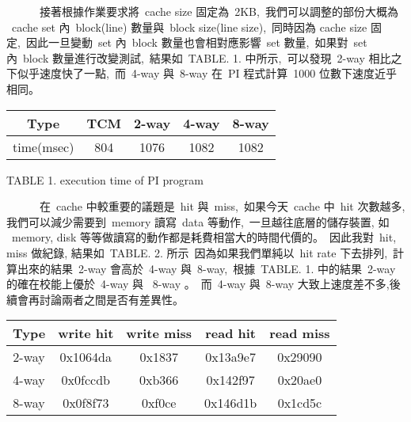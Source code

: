 \documentclass{article}
\begin{document}
\begin{CJK*}{UTF8}{bsmi}
\begin{multicols}{2}
\begin{flushleft}
    \ \ \ \ \ \ 接著根據作業要求將\ cache size 固定為\ 2KB,\
    我們可以調整的部份大概為 \ cache set 內\ block(line) 數量與\ block size(line size),\
    同時因為 cache size 固定,\
    因此一旦變動\ set 內\ block 數量也會相對應影響\ set 數量,\
    如果對\ set 內\ block 數量進行改變測試,\
    結果如\ TABLE. 1. 中所示,\
    可以發現\ 2-way 相比之下似乎速度快了一點,\
    而\ 4-way 與\ 8-way 在\ PI 程式計算\ 1000 位數下速度近乎相同。\
\end{flushleft}

\begin{center}
    \begin{tabular}{||c c c c c ||} 
     \hline
     Type & TCM & 2-way & 4-way & 8-way \\ [2ex] 
     \hline\hline
     time(msec) & 804 & 1076  & 1082 & 1082 \\ 
     \hline
    \end{tabular}
\end{center}

\begin{center}
    \small{TABLE 1. execution time of PI program}\\
\end{center}

\begin{flushleft}
    \ \ \ \ \ \ 在\ cache 中較重要的議題是\ hit 與\ miss,\
    如果今天\ cache 中\ hit 次數越多, 我們可以減少需要到\ memory 讀寫\ data 等動作,\
    一旦越往底層的儲存裝置, 如 \ memory, disk 等等做讀寫的動作都是耗費相當大的時間代價的。\
    因此我對\ hit, miss 做紀錄, 結果如\ TABLE. 2. 所示\
    因為如果我們單純以\ hit rate 下去排列,\
    計算出來的結果\ 2-way 會高於\ 4-way 與\ 8-way,\
    根據\ TABLE. 1. 中的結果\ 2-way 的確在校能上優於\ 4-way 與 \ 8-way 。\
    而\ 4-way 與\ 8-way 大致上速度差不多,後續會再討論兩者之間是否有差異性。
\end{flushleft}

\begin{center}
    \begin{tabular}{||c c c c c ||} 
     \hline
     Type & write hit & write miss & read hit & read miss \\ [2ex] 
     \hline\hline
     2-way & 0x1064da & 0x1837 & 0x13a9e7 & 0x29090  \\ 
     \hline
     4-way & 0x0fccdb & 0xb366 & 0x142f97 & 0x20ae0  \\ 
     \hline
     8-way & 0x0f8f73 & 0xf0ce & 0x146d1b & 0x1cd5c  \\ 
     \hline
    \end{tabular}
\end{center}


\end{multicols}
\end{CJK*}
\end{document}
